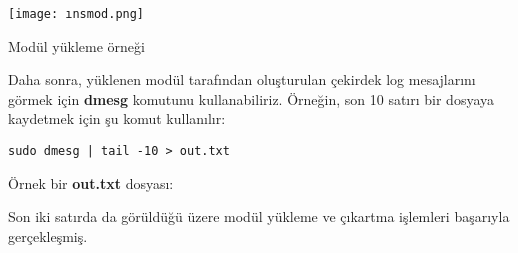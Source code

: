 \documentclass[a4paper,12pt]{article}
\begin{document}
\texttt{[image: ınsmod.png]}
\caption{Modül yükleme örneği}
\par\vspace{1cm}

Daha sonra, yüklenen modül tarafından oluşturulan çekirdek log mesajlarını görmek için \textbf{dmesg} komutunu kullanabiliriz. Örneğin, son 10 satırı bir dosyaya kaydetmek için şu komut kullanılır:
    \begin{lstlisting}[language=shell, caption={dmesg çıktısının son 10 satırı out.txt'ye kaydedilir. }]
    sudo dmesg | tail -10 > out.txt\end{lstlisting}

\par\vspace{1cm}
Örnek bir \textbf{out.txt} dosyası:

\par\vspace{1cm}
Son iki satırda da görüldüğü üzere modül yükleme ve çıkartma işlemleri başarıyla gerçekleşmiş.
\end{document}
